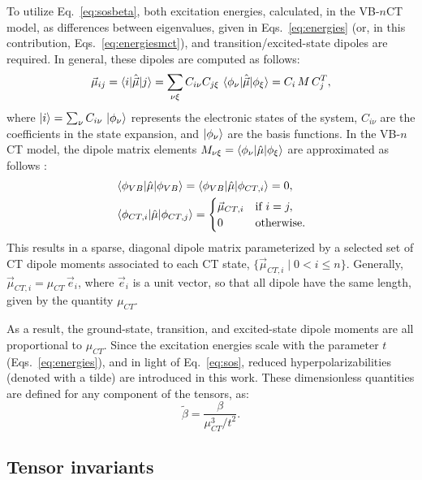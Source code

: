 \documentclass[USenglish]{article}
\begin{document}
To utilize Eq.~\eqref{eq:sosbeta}, both excitation energies, calculated, in the VB-$n$CT model, as differences between eigenvalues, given in Eqs.~\eqref{eq:energies} (or, in this contribution, Eqs.~\eqref{eq:energiesmct}), and transition/excited-state dipoles are required. In general, these dipoles are computed as follows:
\begin{equation}
\vec{\mu}_{ij} = \braket{i | \hat{\vec\mu} | j} = \sum_{\nu\xi} C_{i \nu} C_{j \xi} \, \braket{\phi_\nu | \hat{\vec\mu} | \phi_\xi} = C_i\,M\,C_j^T,
\end{equation}
where $\ket{i} = \sum_\nu C_{i \nu} \, \ket{\phi_\nu}$ represents the electronic states of the system, $C_{i \nu}$ are the coefficients in the state expansion, and $\ket{\phi_\nu}$ are the basis functions. 
In the VB-$n$CT model, the dipole matrix elements $M_{\nu\xi} = \braket{\phi_\nu | \hat{\mu} | \phi_\xi}$ are approximated as follows \cite{luValenceBondChargeTransferModel1994}:
\begin{align}
&\braket{\phi_{VB} | \hat{\mu} | \phi_{VB}} = \braket{\phi_{VB} | \hat{\mu} | \phi_{CT,i}} = 0,\nonumber\\
&\braket{\phi_{CT,i} | \hat{\mu} | \phi_{CT,j}} = 
\begin{cases}
	\vec{\mu}_{CT,i} & \text{if } i = j, \\
	0 & \text{otherwise}.
\end{cases}
\end{align}
This results in a sparse, diagonal dipole matrix parameterized by a selected set of CT dipole moments associated to each CT state, $\{\vec{\mu}_{CT,i} \mid 0 < i \leq n\}$. Generally, $\vec\mu_{CT, i} = \mu_{CT}\,\vec{e}_i$, where $\vec  e_i$ is a unit vector, so that all dipole have the same length, given by the quantity $\mu_{CT}$.  

As a result, the ground-state, transition, and excited-state dipole moments are all proportional to $ \mu_{CT}$. Since the excitation energies scale with the parameter $t$ (Eqs.~\eqref{eq:energies}), and in light of Eq.~\eqref{eq:sos}, reduced hyperpolarizabilities (denoted with a tilde) are introduced in this work. These dimensionless quantities are defined for any component of the tensors, as:
\begin{equation}
	\tilde\beta = \frac{\beta}{\mu_{CT}^3 / t^2}. \label{eq:reduced}
\end{equation}

 
\subsection{Tensor invariants}
\end{document}
